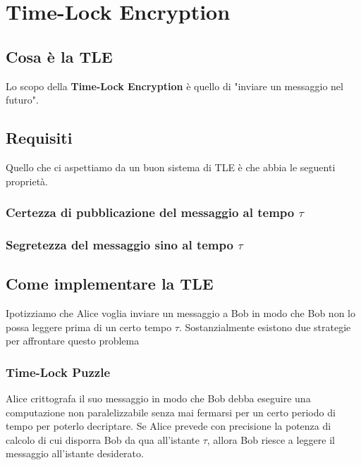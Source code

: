 \chapter{Time-Lock Encryption}

\section{Cosa è la TLE}
Lo scopo della \textbf{Time-Lock Encryption} è quello di "inviare un messaggio nel futuro".

\section{Requisiti}
Quello che ci aspettiamo da un buon sistema di TLE è che abbia le seguenti proprietà.

\subsection{Certezza di pubblicazione del messaggio al tempo $ \tau $}

\subsection{Segretezza del messaggio sino al tempo $ \tau $}
\label{subsec:segretezza-tle}


\section{Come implementare la TLE}
Ipotizziamo che Alice voglia inviare un messaggio a Bob in modo che Bob
non lo possa leggere prima di un certo tempo $ \tau $.
Sostanzialmente esistono due strategie
per affrontare questo problema

\subsection{Time-Lock Puzzle}
Alice crittografa il suo messaggio in modo che Bob debba eseguire una computazione non
paralelizzabile senza mai fermarsi per un certo periodo di tempo per poterlo decriptare.
Se Alice prevede con precisione la potenza di calcolo di cui disporra Bob da qua
all'istante $ \tau $, allora Bob riesce a leggere il messaggio all'istante desiderato.


